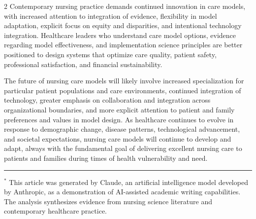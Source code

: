 \documentclass[12pt]{article}
\begin{document}
\begin{multicols}{2}
Contemporary nursing practice demands continued innovation in care models, with increased attention to integration of evidence, flexibility in model adaptation, explicit focus on equity and disparities, and intentional technology integration. Healthcare leaders who understand care model options, evidence regarding model effectiveness, and implementation science principles are better positioned to design systems that optimize care quality, patient safety, professional satisfaction, and financial sustainability.

The future of nursing care models will likely involve increased specialization for particular patient populations and care environments, continued integration of technology, greater emphasis on collaboration and integration across organizational boundaries, and more explicit attention to patient and family preferences and values in model design. As healthcare continues to evolve in response to demographic change, disease patterns, technological advancement, and societal expectations, nursing care models will continue to develop and adapt, always with the fundamental goal of delivering excellent nursing care to patients and families during times of health vulnerability and need.

\vspace{0.2in}
\begin{center}
\hrule
\end{center}

\noindent$^*$ This article was generated by Claude, an artificial intelligence model developed by Anthropic, as a demonstration of AI-assisted academic writing capabilities. The analysis synthesizes evidence from nursing science literature and contemporary healthcare practice.

\end{multicols}

\newpage



\end{document}
